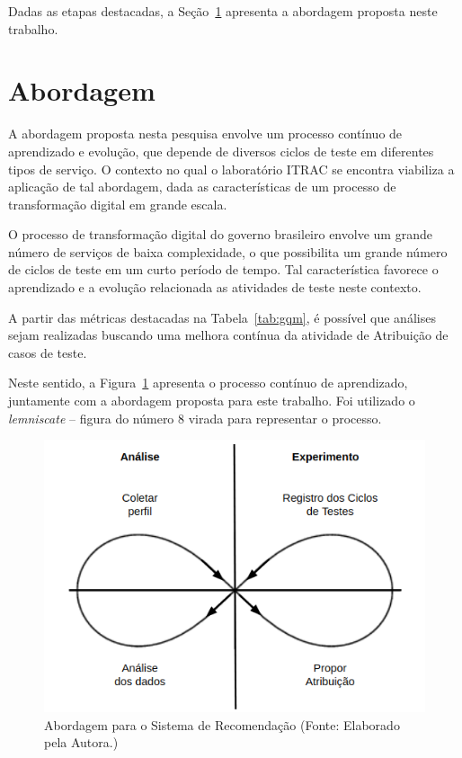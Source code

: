 Dadas as etapas destacadas, a Seção~\ref{sec:abordagem} apresenta a abordagem proposta neste trabalho.

\section{Abordagem}
\label{sec:abordagem}

A abordagem proposta nesta pesquisa envolve um processo contínuo de aprendizado e evolução, que depende de diversos ciclos de teste em diferentes tipos de serviço. O contexto no qual o laboratório ITRAC se encontra viabiliza a aplicação de tal abordagem, dada as características de um processo de transformação digital em grande escala.

O processo de transformação digital do governo brasileiro envolve um grande número de serviços de baixa complexidade, o que possibilita um grande número de ciclos de teste em um curto período de tempo. Tal característica favorece o aprendizado e a evolução relacionada as atividades de teste neste contexto.

A partir das métricas destacadas na Tabela~\ref{tab:gqm}, é possível que análises sejam realizadas buscando uma melhora contínua da atividade de Atribuição de casos de teste.

Neste sentido, a Figura~\ref{fig:Abordagem} apresenta o processo contínuo de aprendizado, juntamente com a abordagem proposta para este trabalho. Foi utilizado o \textit{lemniscate} -- figura do número 8 virada para representar o processo.

        \begin{figure}[h]
          \centering
          \includegraphics[width=13cm]{figuras/abordagem.png}
          \caption{Abordagem para o Sistema de Recomendação  (Fonte: Elaborado pela Autora.)}
          \label{fig:Abordagem}

        \end{figure}


